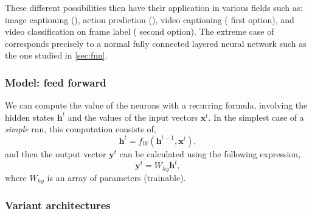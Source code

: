 These different possibilities then have their application in various fields
such as: image captioning (), action prediction (), video captioning ( first option), and video
classification on frame label ( second option). The extreme
case of  corresponds precisely to a normal fully connected
layered neural network such as the one studied in \vref{sec:fnn}.

\subsubsection{Model: feed forward}

We can compute the value of the neurons with a recurring formula, involving the
hidden states \(\mathbf{h}^t\) and the values of the input vectors
\(\mathbf{x}^t\). In the simplest case of a \emph{simple} \gls{rnn}, this
computation consists of,
\begin{equation} \label{eq:rnn-hidden}
  \mathbf{h}^t = f_{W} (\mathbf{h}^{t - 1}, \mathbf{x}^t),
\end{equation}
and then the output vector \(\mathbf{y}^t\) can be calculated using the
following expression,
\begin{equation} \label{eq:rnn-out}
  \mathbf{y}^t = W_{hy}\mathbf{h}^t,
\end{equation}
where \(W_{hy}\) is an array of parameters (trainable).

\subsubsection{Variant  architectures}

